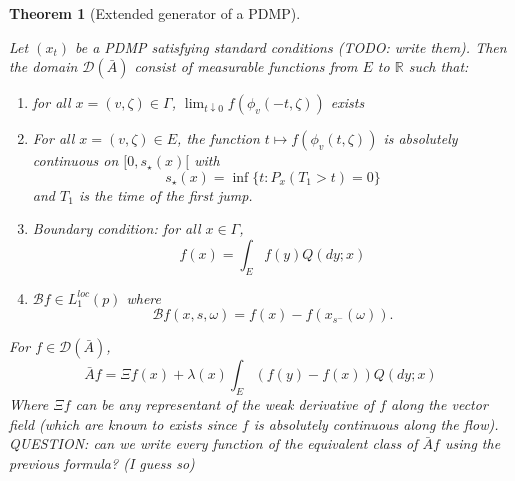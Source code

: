\documentclass[11pt]{amsart}
\newtheorem{theorem}{Theorem}[section]
\theoremstyle{definition}
\theoremstyle{remark}
\newcommand{\depends}[1]{}
\newcommand{\extgen}{\bar{A}}
\newcommand{\VecField}{\Xi}
\begin{document}
\begin{theorem}[Extended generator of a PDMP]\label{th:ext-gen-pdmp}
\depends{def:ext-gen,def:L1-loc-p}
Let $(x_t)$ be a PDMP satisfying standard conditions (TODO: write them). Then the domain $\mathcal{D}(\extgen)$ consist of measurable functions from $E$ to $\mathbb{R}$ such that:
\begin{enumerate}
	\item for all $x = (v,\zeta) \in \Gamma$, $\lim_{t \downarrow 0} f(\phi_v(-t,\zeta))$ exists
	\item For all $x = (v,\zeta) \in E$, the function $t\mapsto f(\phi_v(t,\zeta))$ is absolutely continuous on $[0,s_\star(x)[$ with 
	\[
		s_\star(x) = \inf \{t : P_x(T_1 > t) = 0 \}
	\]
	and $T_1$ is the time of the first jump.
	\item Boundary condition: for all $x\in \Gamma$,
	\[
		f(x) = \int_E f(y) Q(dy;x)
	\]
	\item $\mathcal{B} f \in L_1^{loc}(p)$ where
	\[
		\mathcal{B} f(x,s,\omega) = f(x) - f(x_{s^-}(\omega)).
	\]
\end{enumerate}
For $f \in \mathcal{D}(\extgen)$, 
\[
	\extgen f = \VecField f (x) + \lambda(x) \int_E (f(y)-f(x))Q(dy;x)
\]
Where $\VecField f$ can be any representant of the weak derivative of $f$ along the vector field (which are known to exists since $f$ is absolutely continuous along the flow). QUESTION: can we write every function of the equivalent class of $\extgen f$ using the previous formula? (I guess so)
\end{theorem}
\end{document}
